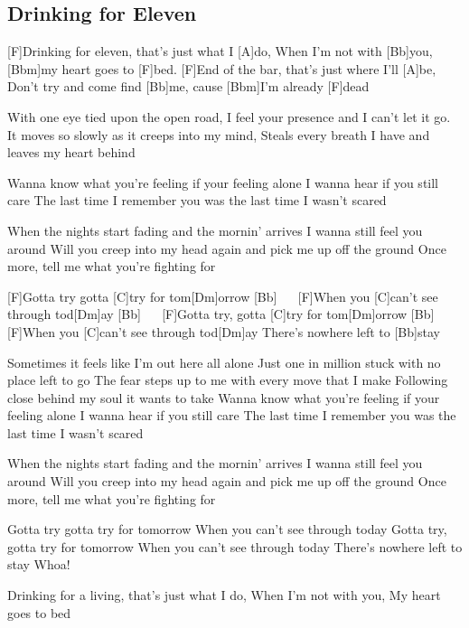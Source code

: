 \subsection*{Drinking for Eleven   }
\begin{guitar}
[F]Drinking for eleven, that's just what I [A]do,
When I'm not with [Bb]you, [Bbm]my heart goes to [F]bed.
[F]End of the bar, that's just where I'll [A]be,
Don't try and come find [Bb]me, cause [Bbm]I'm already [F]dead

With one eye tied upon the open road,
I feel your presence and I can't let it go.
It moves so slowly as it creeps into my mind,
Steals every breath I have and leaves my heart behind

Wanna know what you're feeling if your feeling alone
I wanna hear if you still care
The last time I remember you was the last time I wasn't scared

When the nights start fading and the mornin' arrives
I wanna still feel you around
Will you creep into my head again and pick me up off the ground
Once more, tell me what you're fighting for

[F]Gotta try gotta [C]try for tom[Dm]orrow [Bb] $\quad$
[F]When you [C]can't see through tod[Dm]ay [Bb] $\quad$
[F]Gotta try, gotta [C]try for tom[Dm]orrow [Bb] $\quad$
[F]When you [C]can't see through tod[Dm]ay
There's nowhere left to [Bb]stay

Sometimes it feels like I'm out here all alone
Just one in million stuck with no place left to go
The fear steps up to me with every move that I make
Following close behind my soul it wants to take
Wanna know what you're feeling if your feeling alone
I wanna hear if you still care
The last time I remember you was the last time I wasn't scared

When the nights start fading and the mornin' arrives
I wanna still feel you around
Will you creep into my head again and pick me up off the ground
Once more, tell me what you're fighting for

Gotta try gotta try for tomorrow
When you can't see through today
Gotta try, gotta try for tomorrow
When you can't see through today
There's nowhere left to stay
Whoa!

Drinking for a living, that's just what I do,
When I'm not with you,
My heart goes to bed
\end{guitar}
